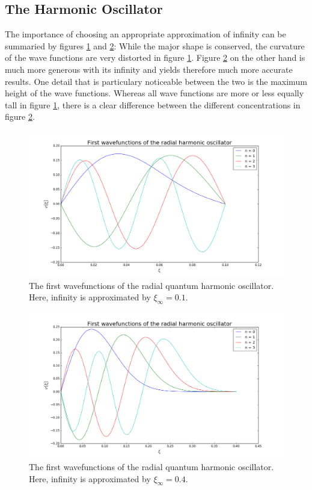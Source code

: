 \documentclass[reprint,english]{revtex4-1}
\begin{document}
\subsection{The Harmonic Oscillator}
The importance of choosing an appropriate approximation of infinity can be summaried by figures \ref{fig:harmonicoscillator_eigenvectors1} and \ref{fig:harmonicoscillator_eigenvectors2}: While the major shape is conserved, the curvature of the wave functions are very distorted in figure \ref{fig:harmonicoscillator_eigenvectors1}. Figure \ref{fig:harmonicoscillator_eigenvectors2} on the other hand is much more generous with its infinity and yields therefore much more accurate results. One detail that is particulary noticeable between the two is the maximum height of the wave functions. Whereas all wave functions are more or less equally tall in figure \ref{fig:harmonicoscillator_eigenvectors1}, there is a clear difference between the different concentrations in figure \ref{fig:harmonicoscillator_eigenvectors2}.
\begin{figure}[h]
\centering
\includegraphics[scale=0.27]{HarmonicOscillator/plots/wavefunction80_1.png}
\caption{The first wavefunctions of the radial quantum harmonic oscillator. Here, infinity is approximated by \(\xi_\infty=0.1\).}
\label{fig:harmonicoscillator_eigenvectors1}
\end{figure}
\begin{figure}[h]
\centering
\includegraphics[scale=0.27]{HarmonicOscillator/plots/wavefunction80_4.png}
\caption{The first wavefunctions of the radial quantum harmonic oscillator. Here, infinity is approximated by \(\xi_\infty=0.4\).}
\label{fig:harmonicoscillator_eigenvectors2}
\end{figure}
\end{document}
